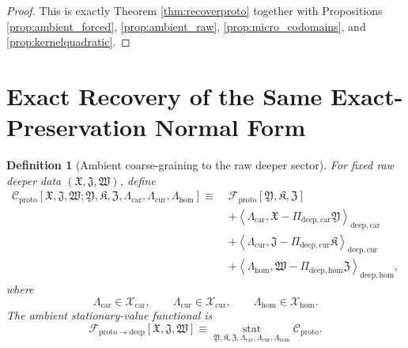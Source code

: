 \documentclass[11pt]{article}
\newcommand{\ProtoFunctional}{\mathscr F_{\mathrm{proto}}}
\newcommand{\ProtoToDeep}{\mathscr F_{\mathrm{proto}\to\mathrm{deep}}}
\newcommand{\DeepTensorClass}{\mathscr X_{\mathrm{car}}}
\newcommand{\DeepRelabelClass}{\mathscr X_{\mathrm{cur}}}
\newcommand{\DeepFreeClass}{\mathscr X_{\mathrm{hom}}}
\newcommand{\DeepTensor}{\mathfrak X}
\newcommand{\DeepRelabel}{\mathfrak J}
\newcommand{\DeepFree}{\mathfrak W}
\newcommand{\ProtoTensor}{\mathfrak Y}
\newcommand{\ProtoRelabel}{\mathfrak K}
\newcommand{\ProtoFree}{\mathfrak Z}
\newcommand{\ProtoCarProj}{\Pi_{\mathrm{deep,car}}}
\newcommand{\ProtoCurProj}{\Pi_{\mathrm{deep,cur}}}
\newcommand{\ProtoHomProj}{\Pi_{\mathrm{deep,hom}}}
\newtheorem{definition}{Definition}
\begin{document}
\begin{proof}
This is exactly Theorem \ref{thm:recoverproto} together with Propositions \ref{prop:ambient_forced}, \ref{prop:ambient_raw}, \ref{prop:micro_codomains}, and \ref{prop:kernelquadratic}.
\end{proof}

\section{Exact Recovery of the Same Exact-Preservation Normal Form}

\begin{definition}[Ambient coarse-graining to the raw deeper sector]
\label{def:Cproto}
For fixed raw deeper data \((\DeepTensor,\DeepRelabel,\DeepFree)\), define
\begin{equation}
\begin{aligned}
\mathscr C_{\mathrm{proto}}
[\DeepTensor,\DeepRelabel,\DeepFree;
\ProtoTensor,\ProtoRelabel,\ProtoFree,
\Lambda_{\mathrm{car}},\Lambda_{\mathrm{cur}},\Lambda_{\mathrm{hom}}]
\equiv\;
&\ProtoFunctional[\ProtoTensor,\ProtoRelabel,\ProtoFree]
\\
&+\left\langle
\Lambda_{\mathrm{car}},
\DeepTensor-\ProtoCarProj\ProtoTensor
\right\rangle_{\mathrm{deep,car}}
\\
&+\left\langle
\Lambda_{\mathrm{cur}},
\DeepRelabel-\ProtoCurProj\ProtoRelabel
\right\rangle_{\mathrm{deep,cur}}
\\
&+\left\langle
\Lambda_{\mathrm{hom}},
\DeepFree-\ProtoHomProj\ProtoFree
\right\rangle_{\mathrm{deep,hom}},
\end{aligned}
\label{eq:Cproto}
\end{equation}
where
\[
\Lambda_{\mathrm{car}}\in\DeepTensorClass,\qquad
\Lambda_{\mathrm{cur}}\in\DeepRelabelClass,\qquad
\Lambda_{\mathrm{hom}}\in\DeepFreeClass.
\]
The ambient stationary-value functional is
\begin{equation}
\ProtoToDeep[\DeepTensor,\DeepRelabel,\DeepFree]
\equiv
\operatorname*{stat}_{\ProtoTensor,\ProtoRelabel,\ProtoFree,\Lambda_{\mathrm{car}},\Lambda_{\mathrm{cur}},\Lambda_{\mathrm{hom}}}
\mathscr C_{\mathrm{proto}}.
\label{eq:Fprotostat}
\end{equation}
\end{definition}
\end{document}
